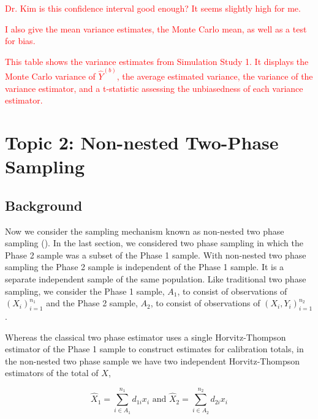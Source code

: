 \documentclass[12pt]{article}
\begin{document}
\textcolor{red}{Dr. Kim is this confidence interval good enough? It seems
slightly high for me.}

\textcolor{red}{I also give the mean variance estimates, the Monte Carlo mean,
as well as a test for bias.}
\begin{table}[ht!]
  \centering
{\color{red}  }
\caption{\textcolor{red}{This table shows the variance estimates from Simulation
    Study 1. It displays the Monte Carlo variance of $\hat Y^{(b)}$, the average
    estimated variance, the variance of the variance estimator, and a
    t-statistic assessing the unbiasedness of each variance estimator.}}
\label{tab:tpdc-var}
\end{table}

\section{Topic 2: Non-nested Two-Phase Sampling}

\subsection{Background}

Now we consider the sampling mechanism known as non-nested two phase sampling 
(\cite{hidiroglou2001double}). In the last section, we considered two phase sampling
in which the Phase 2 sample was a subset of the Phase 1 sample. With non-nested
two phase sampling the Phase 2 sample is independent of the Phase 1 sample. It
is a separate independent sample of the same population. Like traditional two
phase sampling, we consider the Phase 1 sample, $A_1$, to consist of
observations of $(X_i)_{i = 1}^{n_1}$ and the Phase 2 sample, $A_2$, to consist
of observations of $(X_i, Y_i)_{i = 1}^{n_2}$. 

Whereas the classical two phase estimator uses a single Horvitz-Thompson
estimator of the Phase 1 sample to construct estimates for calibration totals,
in the non-nested two phase sample we have two independent Horvitz-Thompson
estimators of the total of $X$,

$$\hat X_1 = \sum_{i \in A_1}^{n_1} d_{1i} x_i \text{ and } 
\hat X_2 = \sum_{i \in A_2}^{n_2} d_{2i} x_i $$
\end{document}
